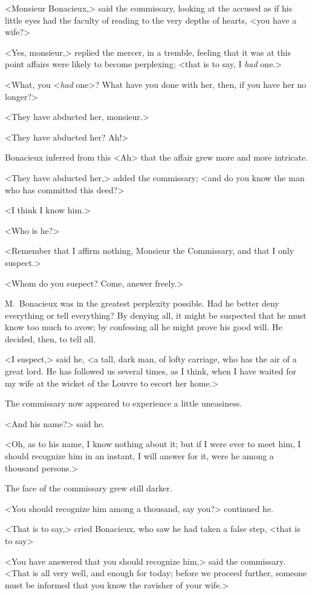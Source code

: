<Monsieur Bonacieux,> said the commissary, looking at the accused as if his little eyes had the faculty of reading to the very depths of hearts, <you have a wife?> 

<Yes, monsieur,> replied the mercer, in a tremble, feeling that it was at this point affairs were likely to become perplexing; <that is to say, I \emph{had} one.> 

<What, you <\emph{had} one>? What have you done with her, then, if you have her no longer?> 

<They have abducted her, monsieur.> 

<They have abducted her? Ah!> 

Bonacieux inferred from this <Ah> that the affair grew more and more intricate. 

<They have abducted her,> added the commissary; <and do you know the man who has committed this deed?> 

<I think I know him.> 

<Who is he?> 

<Remember that I affirm nothing, Monsieur the Commissary, and that I only suspect.> 

<Whom do you suspect? Come, answer freely.> 

M.~Bonacieux was in the greatest perplexity possible. Had he better deny everything or tell everything? By denying all, it might be suspected that he must know too much to avow; by confessing all he might prove his good will. He decided, then, to tell all. 

<I suspect,> said he, <a tall, dark man, of lofty carriage, who has the air of a great lord. He has followed us several times, as I think, when I have waited for my wife at the wicket of the Louvre to escort her home.> 

The commissary now appeared to experience a little uneasiness. 

<And his name?> said he. 

<Oh, as to his name, I know nothing about it; but if I were ever to meet him, I should recognize him in an instant, I will answer for it, were he among a thousand persons.> 

The face of the commissary grew still darker. 

<You should recognize him among a thousand, say you?> continued he. 

<That is to say,> cried Bonacieux, who saw he had taken a false step, <that is to say\longdash> 

<You have answered that you should recognize him,> said the commissary. <That is all very well, and enough for today; before we proceed further, someone must be informed that you know the ravisher of your wife.> 


